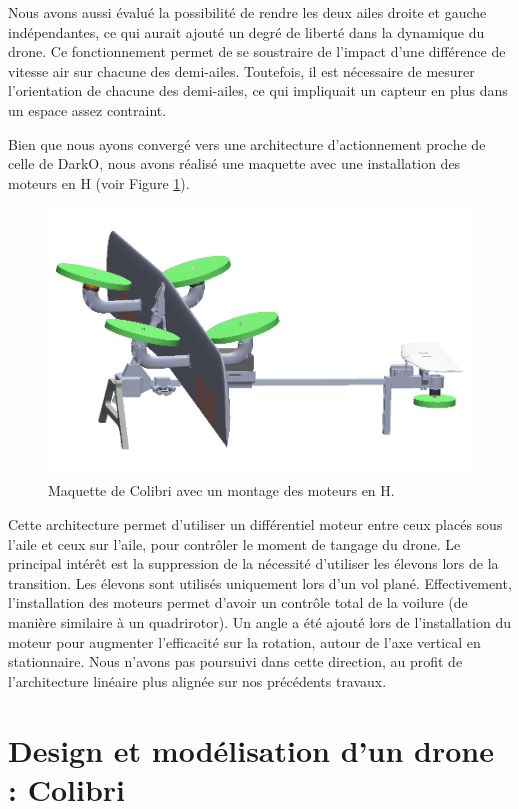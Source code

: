  Nous avons aussi évalué la possibilité de rendre les deux ailes droite et gauche indépendantes, ce qui aurait ajouté un degré de liberté dans la dynamique du drone. Ce fonctionnement permet de se soustraire de l'impact d'une différence de vitesse air sur chacune des demi-ailes. Toutefois, il est nécessaire de mesurer l'orientation de chacune des demi-ailes, ce qui impliquait un capteur en plus dans un espace assez contraint.

Bien que nous ayons convergé vers une architecture d'actionnement proche de celle de DarkO, nous avons réalisé une maquette avec une installation des moteurs en H (voir Figure \ref{fig:ColibriH}). 

\begin{figure}[ht!]
    \centering
    \includegraphics[width=0.7\columnwidth]{figures/colibriH.png}
    \caption{Maquette de Colibri avec un montage des moteurs en H.}
    \label{fig:ColibriH}
\end{figure}
Cette architecture permet d'utiliser un différentiel moteur entre ceux placés sous l'aile et ceux sur l'aile, pour contrôler le moment de tangage du drone. Le principal intérêt est la suppression de la nécessité d'utiliser les élevons lors de la transition. Les élevons sont utilisés uniquement lors d'un vol plané.
Effectivement, l'installation des moteurs permet d'avoir un contrôle total de la voilure (de manière similaire à un quadrirotor). Un angle a été ajouté lors de l'installation du moteur pour augmenter l'efficacité sur la rotation, autour de l'axe vertical en stationnaire.
Nous n'avons pas poursuivi dans cette direction, au profit de l'architecture linéaire plus alignée sur nos précédents travaux.




\section{Design et modélisation d'un drone : Colibri}
\label{sec:model_colibri}

